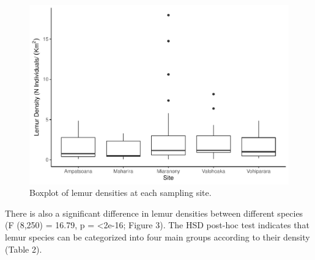 \documentclass[
  12pt,
]{article}
\begin{document}
\begin{figure}
\centering
\includegraphics{project_draft_2_files/figure-latex/unnamed-chunk-9-1.pdf}
\caption{Boxplot of lemur densities at each sampling site.}
\end{figure}

There is also a significant difference in lemur densities between
different species (F (8,250) = 16.79, p = \textless2e-16; Figure 3). The
HSD post-hoc test indicates that lemur species can be categorized into
four main groups according to their density (Table 2).
\end{document}
